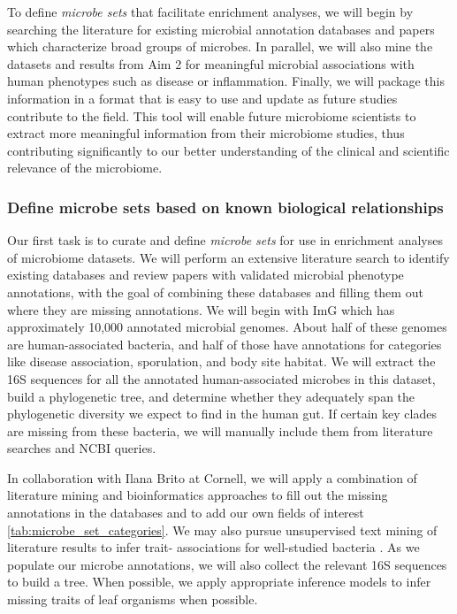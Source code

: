 \documentclass[12pt]{article}
\begin{document}
To define \textit{microbe sets} that facilitate enrichment analyses, we will
begin by searching the literature for existing microbial annotation
databases and papers which characterize broad groups of microbes.
In parallel, we will also mine the datasets and results from Aim 2
for meaningful microbial associations with human phenotypes such as
disease or inflammation. Finally, we will package this information
in a format that is easy to use and update as future studies contribute
to the field. This tool will enable future microbiome scientists to extract more
meaningful information from their microbiome studies, thus
contributing significantly to our better understanding of the
clinical and scientific relevance of the microbiome.


\subsubsection{Define microbe sets based on known biological relationships}

Our first task is to curate and define \textit{microbe sets} for use in enrichment analyses of 
microbiome datasets. We will perform an extensive literature search
to identify existing databases and review papers with validated microbial phenotype annotations, with the goal of
combining these databases and filling them out where they are missing annotations.
We will begin with ImG which has approximately 10,000 annotated microbial genomes. 
About half of these genomes are human-associated bacteria, 
and half of those have annotations for categories like disease 
association, sporulation, and body site habitat. 
We will extract the 16S sequences for all the annotated human-associated 
microbes in this dataset, build a phylogenetic tree, and determine whether 
they adequately span the phylogenetic diversity we expect to 
find in the human gut. If certain key clades are missing from these 
bacteria, we will manually include them from literature searches and 
NCBI queries.

In collaboration with Ilana Brito at Cornell, we will apply a 
combination of literature mining and bioinformatics approaches to fill 
out the missing annotations in the databases and to add our own fields 
of interest \ref{tab:microbe_set_categories}. We may also 
pursue unsupervised text mining of literature results to infer trait-
associations for well-studied bacteria \cite{korbel-lit_mining-2005}. As we populate 
our microbe annotations, we will also collect the relevant 16S sequences to 
build a tree. When possible, we apply appropriate inference models to infer 
missing traits of leaf organisms when possible.
\end{document}
